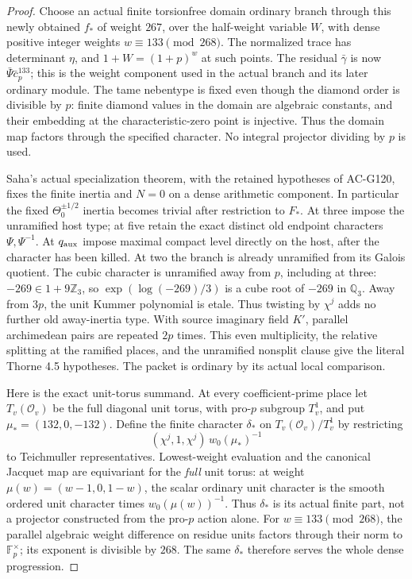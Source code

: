 \begin{proof}
Choose an actual finite torsionfree domain ordinary branch
through this newly obtained \(f_*\) of weight \(267\), over the
half-weight variable \(W\), with
dense positive integer weights \(w\equiv133\pmod{268}\).
The normalized trace has determinant \(\eta\), and
\(1+W=(1+p)^w\) at such points.
The residual \(\bar\gamma\) is now
\(\bar\Psi\bar c_p^{133}\); this is the weight component used in
the actual branch and its later ordinary module.
The tame nebentype is fixed even though the diamond order is
divisible by \(p\): finite diamond values in the domain are
algebraic constants, and their embedding at the characteristic-zero
point is injective.  Thus the domain map factors through the
specified character.  No integral projector dividing by \(p\)
is used.

Saha's actual specialization theorem, with the retained hypotheses
of AC-G120, fixes the finite inertia and \(N=0\) on a dense
arithmetic component.  In particular the fixed
\(\Theta_0^{\pm1/2}\) inertia becomes trivial after restriction
to \(F_*\).  At three impose the unramified host type;
at five retain the exact distinct old endpoint characters
\(\Psi,\Psi^{-1}\).  At \(q_{\rm aux}\) impose maximal compact
level directly on the host, after the character has been killed.
At two the branch is already unramified from its Galois quotient.
The cubic character is unramified away from \(p\), including
at three: \(-269\in1+9\mathbb Z_3\), so
\(\exp(\log(-269)/3)\) is a cube root of \(-269\) in
\(\mathbb Q_3\).  Away from \(3p\), the unit Kummer
polynomial is etale.  Thus twisting by \(\chi^j\) adds
no further old away-inertia type.
With source imaginary field \(K'\), parallel archimedean pairs
are repeated \(2p\) times.  This even multiplicity, the relative
splitting at the ramified places, and the unramified nonsplit
clause give the literal Thorne 4.5 hypotheses.
The packet is ordinary by its actual local comparison.

Here is the exact unit-torus summand.  At every coefficient-prime
place let \(T_v(\mathcal O_v)\) be the full diagonal unit torus,
with pro-\(p\) subgroup \(T_v^1\), and put
\(\mu_*=(132,0,-132)\).
Define the finite character \(\delta_*\) on
\(T_v(\mathcal O_v)/T_v^1\) by restricting
\[
             (\chi^j,1,\chi^j)\,w_0(\mu_*)^{-1}
\]
to Teichmuller representatives.  Lowest-weight evaluation and
the canonical Jacquet map are equivariant for the \emph{full}
unit torus: at weight
\(\mu(w)=(w-1,0,1-w)\), the scalar ordinary unit character is
the smooth ordered unit character times \(w_0(\mu(w))^{-1}\).
Thus \(\delta_*\) is its actual finite part, not a projector
constructed from the pro-\(p\) action alone.  For
\(w\equiv133\pmod{268}\), the parallel algebraic weight difference
on residue units factors through their norm to \(\mathbb F_p^\times\);
its exponent is divisible by \(268\).  The same \(\delta_*\)
therefore serves the whole dense progression.


\end{proof}
